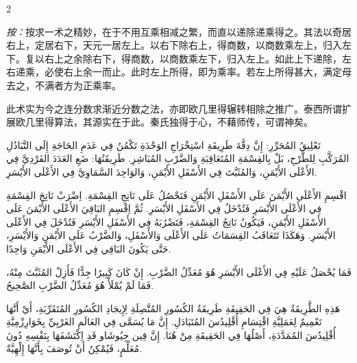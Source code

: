 \documentclass[11pt,a4paper]{article}
\newcommand{\ar}[1]{\arabicfont\beginR #1\endR}
\newenvironment{bilingual}{%
  \begin{paracol}{2}
}{%
  \end{paracol}
}
\begin{document}
\begin{bilingual}

\begin{leftcolumn*}
\textit{按：}按求一术之精妙，在于不用互乘相减之繁，而直以递除递乘得之。其法以奇居右上，定居右下，天元一居左上。以右下除右上，得商数，以商数乘左上，归入左下。复以右上之余除右下，得商数，以商数乘左下，归入左上。如此上下递除，左右递乘，必使右上余一而止。此时左上所得，即为乘率。若左上所得甚大，满定母去之，不满者方为正乘率。

此术实为今之连分数求渐近分数之法，亦即欧几里得辗转相除之推广。泰西所谓扩展欧几里得算法，其源实在于此。秦氏独得于心，不藉师传，可谓神矣。
\end{leftcolumn*}

\begin{rightcolumn*}
\ar{تَعْلِيقُ المُحَرِّرِ: إِنَّ دِقَّةَ طَرِيقَةِ اسْتِخْرَاجِ الوَحْدَةِ تَكْمُنُ فِي عَدَمِ الحَاجَةِ إِلَى التَّبَادُلِ المُرَكَّبِ لِلطَّرْحِ، بَلْ بِالقِسْمَةِ المُتَعَاقِبَةِ وَالضَّرْبِ المُبَاشِرِ. طَرِيقَتُهَا: ضَعِ العَدَدَ الفَرْدِيَّ فِي الأَعْلَى الأَيْمَنِ، وَالمُثَبَّتَ فِي الأَسْفَلِ الأَيْمَنِ، وَالوَاحِدَ السَّمَاوِيَّ فِي الأَعْلَى الأَيْسَرِ.}

\ar{اقْسِمِ الأَعْلَى الأَيْمَنَ عَلَى الأَسْفَلِ الأَيْمَنِ فَتَحْصُلُ عَلَى نَاتِجِ القِسْمَةِ. اِضْرَبْ نَاتِجَ القِسْمَةِ فِي الأَعْلَى الأَيْسَرِ فَتُدْخَلُ فِي الأَسْفَلِ الأَيْسَرِ. ثُمَّ اِقْسِمِ البَاقِيَ الأَعْلَى الأَيْمَنَ عَلَى الأَسْفَلِ الأَيْمَنِ، فَيَكُونُ نَاتِجُ القِسْمَةِ، فَتَضْرُبَهُ فِي الأَسْفَلِ الأَيْسَرِ فَتُدْخَلَ فِي الأَعْلَى الأَيْسَرِ. وَهَكَذَا تَتَعَاقَبُ القِسَمَاتُ عَلَى الأَعْلَى وَالأَسْفَلِ، وَالضَّرْبُ عَلَى الأَيْمَنِ وَالأَيْسَرِ، حَتَّى يَكُونَ البَاقِي فِي الأَعْلَى الأَيْمَنِ وَاحِدًا.}

\ar{فَمَا يُحْصَلُ عَلَيْهِ فِي الأَعْلَى الأَيْسَرِ هُوَ مُعَدِّلُ الضَّرْبِ. إِنْ كَانَ كَبِيرًا جِدًّا فَأَزِلْ المُثَبَّتَ مِنْهُ، فَمَا لَمْ يُمْلَأْ هُوَ مُعَدِّلُ الضَّرْبِ الصَّحِيحُ.}

\ar{هَذِهِ الطَّرِيقَةُ هِيَ فِي الحَقِيقَةِ طَرِيقَةُ الكُسُورِ المُتَّصِلَةِ لِإِيجَادِ الكُسُورِ المُتَقَرِّبَةِ، أَيْ أَنَّهَا تَعْمِيمٌ لِعَمَلِيَّةِ اقْتِسَامِ أُقْلِيدُسَ المُتَبَادَلِ. إِنَّ مَا يُسَمَّى فِي العَالَمِ الغَرْبِيِّ بِخَوَارِزْمِيَّةِ أُقْلِيدُسَ المُمَدَّدَةِ، أَصْلُهَا فِي الحَقِيقَةِ مِنْ هُنَا. إِنَّ قِين جِيُوشَاو قَدِ اِكْتَشَفَهَا بِنَفْسِهِ دُونَ مُعَلِّمٍ، فَيُمْكِنُ أَنْ تُوصَفَ بِأَنَّهَا إِلْهِيَّةٌ.}
\end{rightcolumn*}

\end{bilingual}
\end{document}
